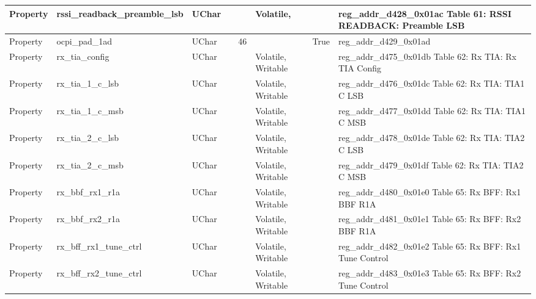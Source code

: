 \documentclass{article}
\begin{document}
\begin{scriptsize}
\begin{longtable}{|p{2cm}|p{5cm}|p{1cm}|p{2cm}|p{2cm}|p{1.75cm}|p{1.5cm}|p{5.1cm}|}
  \hline
  Property & rssi\_readback\_preamble\_lsb                            & UChar &                  &                  & Volatile,           &         & reg\_addr\_d428\_0x01ac Table 61: RSSI READBACK: Preamble LSB \\
  \hline
  Property & ocpi\_pad\_1ad                                           & UChar &                  & 46               &                     & True    & reg\_addr\_d429\_0x01ad \\
  \hline
  Property & rx\_tia\_config                                          & UChar &                  &                  & Volatile,  Writable &         & reg\_addr\_d475\_0x01db Table 62: Rx TIA: Rx TIA Config \\
  \hline
  Property & rx\_tia\_1\_c\_lsb                                       & UChar &                  &                  & Volatile,  Writable &         & reg\_addr\_d476\_0x01dc Table 62: Rx TIA: TIA1 C LSB \\
  \hline
  Property & rx\_tia\_1\_c\_msb                                       & UChar &                  &                  & Volatile,  Writable &         & reg\_addr\_d477\_0x01dd Table 62: Rx TIA: TIA1 C MSB \\
  \hline
  Property & rx\_tia\_2\_c\_lsb                                       & UChar &                  &                  & Volatile,  Writable &         & reg\_addr\_d478\_0x01de Table 62: Rx TIA: TIA2 C LSB \\
  \hline
  Property & rx\_tia\_2\_c\_msb                                       & UChar &                  &                  & Volatile,  Writable &         & reg\_addr\_d479\_0x01df Table 62: Rx TIA: TIA2 C MSB \\
  \hline
  Property & rx\_bbf\_rx1\_r1a                                        & UChar &                  &                  & Volatile,  Writable &         & reg\_addr\_d480\_0x01e0 Table 65: Rx BFF: Rx1 BBF R1A \\
  \hline
  Property & rx\_bbf\_rx2\_r1a                                        & UChar &                  &                  & Volatile,  Writable &         & reg\_addr\_d481\_0x01e1 Table 65: Rx BFF: Rx2 BBF R1A \\
  \hline
  Property & rx\_bff\_rx1\_tune\_ctrl                                 & UChar &                  &                  & Volatile,  Writable &         & reg\_addr\_d482\_0x01e2 Table 65: Rx BFF: Rx1 Tune Control \\
  \hline
  Property & rx\_bff\_rx2\_tune\_ctrl                                 & UChar &                  &                  & Volatile,  Writable &         & reg\_addr\_d483\_0x01e3 Table 65: Rx BFF: Rx2 Tune Control \\

\end{longtable}
\end{scriptsize}
\end{document}
